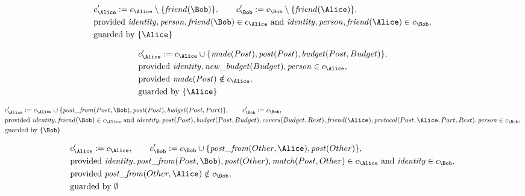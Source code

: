 \begin{align*}
&
c'_
{
\Alice
}
 := 
c_
{
\Alice
}
 \setminus 
\{
\mathit{\detokenize{
friend
}}
(
\Bob
)
\}
, \qquad 
c'_
{
\Bob
}
 := 
c_
{
\Bob
}
 \setminus 
\{
\mathit{\detokenize{
friend
}}
(
\Alice
)
\}
,\\
&
\text{provided } 
\mathit{\detokenize{
identity
}}
,
\mathit{\detokenize{
person
}}
,
\mathit{\detokenize{
friend
}}
(
\Bob
)
 \in c_
{
\Alice
}
 \text{ and } 
\mathit{\detokenize{
identity
}}
,
\mathit{\detokenize{
person
}}
,
\mathit{\detokenize{
friend
}}
(
\Alice
)
 \in c_
{
\Bob
}
,\\
&
\text{guarded by } \{
\Alice
\}
\end{align*}

\begin{align*}
&
c'_
{
\Alice
}
 := 
c_
{
\Alice
}
 \cup 
\{
\mathit{\detokenize{
made
}}
(
Post
)
,
\mathit{\detokenize{
post
}}
(
Post
)
,
\mathit{\detokenize{
budget
}}
(
Post
,
Budget
)
\}
,\\
&
\text{provided } 
\mathit{\detokenize{
identity
}}
,
\mathit{\detokenize{
new_budget
}}
(
Budget
)
,
\mathit{\detokenize{
person
}}
 \in c_
{
\Alice
}
,\\
&
\text{provided } 
\mathit{\detokenize{
made
}}
(
Post
)
 \notin c_
{
\Alice
}
,\\
&
\text{guarded by } \{
\Alice
\}
\end{align*}

\begin{align*}
&
c'_
{
\Alice
}
 := 
c_
{
\Alice
}
 \cup 
\{
\mathit{\detokenize{
post_from
}}
(
Post
,
\Bob
)
,
\mathit{\detokenize{
post
}}
(
Post
)
,
\mathit{\detokenize{
budget
}}
(
Post
,
Part
)
\}
, \qquad 
c'_
{
\Bob
}
 := 
c_
{
\Bob
}
,\\
&
\text{provided } 
\mathit{\detokenize{
identity
}}
,
\mathit{\detokenize{
friend
}}
(
\Bob
)
 \in c_
{
\Alice
}
 \text{ and } 
\mathit{\detokenize{
identity
}}
,
\mathit{\detokenize{
post
}}
(
Post
)
,
\mathit{\detokenize{
budget
}}
(
Post
,
Budget
)
,
\mathit{\detokenize{
covers
}}
(
Budget
,
Rest
)
,
\mathit{\detokenize{
friend
}}
(
\Alice
)
,
\mathit{\detokenize{
protocol
}}
(
Post
,
\Alice
,
Part
,
Rest
)
,
\mathit{\detokenize{
person
}}
 \in c_
{
\Bob
}
,\\
&
\text{guarded by } \{
\Bob
\}
\end{align*}

\begin{align*}
&
c'_
{
\Alice
}
 := 
c_
{
\Alice
}
, \qquad 
c'_
{
\Bob
}
 := 
c_
{
\Bob
}
 \cup 
\{
\mathit{\detokenize{
post_from
}}
(
Other
,
\Alice
)
,
\mathit{\detokenize{
post
}}
(
Other
)
\}
,\\
&
\text{provided } 
\mathit{\detokenize{
identity
}}
,
\mathit{\detokenize{
post_from
}}
(
Post
,
\Bob
)
,
\mathit{\detokenize{
post
}}
(
Other
)
,
\mathit{\detokenize{
match
}}
(
Post
,
Other
)
 \in c_
{
\Alice
}
 \text{ and } 
\mathit{\detokenize{
identity
}}
 \in c_
{
\Bob
}
,\\
&
\text{provided } 
\mathit{\detokenize{
post_from
}}
(
Other
,
\Alice
)
 \notin c_
{
\Bob
}
,\\
&
\text{guarded by } \emptyset
\end{align*}
